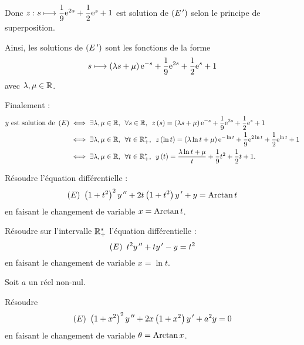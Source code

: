\begin{corr}
Donc \(z:s\longmapsto\dfrac{1}{9}\mathrm{e}^{2s}+\dfrac{1}{2}\mathrm{e}^{s}+1\) est solution de \(\left(E^{\,\prime}\right)\) selon le principe de superposition.

Ainsi, les solutions de \(\left(E^{\,\prime}\right)\) sont les fonctions de la forme \[s\longmapsto\left(\lambda s+\mu\right)\mathrm{e}^{-s}+\dfrac{1}{9}\mathrm{e}^{2s}+\dfrac{1}{2}\mathrm{e}^{s}+1\] avec \(\lambda,\mu\in\mathbb{R}\).

Finalement : \[\begin{aligned}
y\text{ est solution de }\paren{E}&\ssi\quantifs{\exists\lambda,\mu\in\R;\forall s\in\R}z\paren{s}=\paren{\lambda s+\mu}\e{-s}+\dfrac{1}{9}\e{2s}+\dfrac{1}{2}\e{s}+1 \\
&\ssi\quantifs{\exists\lambda,\mu\in\R;\forall t\in\Rps}z\paren{\ln t}=\paren{\lambda\ln t+\mu}\e{-\ln t}+\dfrac{1}{9}\e{2\ln t}+\dfrac{1}{2}\e{\ln t}+1 \\
&\ssi\quantifs{\exists\lambda,\mu\in\R;\forall t\in\Rps}y\paren{t}=\dfrac{\lambda\ln t+\mu}{t}+\dfrac{1}{9}t^2+\dfrac{1}{2}t+1.
\end{aligned}\]
\end{corr}

\begin{exo}[Exercice 11]
Résoudre l'équation différentielle : \[\left(E\right)~\left(1+t^2\right)^2y^{\,\prime\prime}+2t\left(1+t^2\right)y^{\,\prime}+y=\operatorname{Arctan} t\] en faisant le changement de variable \(x=\operatorname{Arctan} t\).
\end{exo}

\begin{corr}
\end{corr}

\begin{exo}[Exercice 12]
Résoudre sur l'intervalle \(\mathbb{R}_+^*\) l'équation différentielle : \[\left(E\right)~t^2y^{\,\prime\prime}+ty^{\,\prime}-y=t^2\] en faisant le changement de variable \(x=\ln t\).
\end{exo}

\begin{corr}
\end{corr}

\begin{exo}
Soit \(a\) un réel non-nul.

Résoudre \[\left(E\right)~\left(1+x^2\right)^2y^{\,\prime\prime}+2x\left(1+x^2\right)y^{\,\prime}+a^2y=0\] en faisant le changement de variable \(\theta=\operatorname{Arctan} x\).
\end{exo}

\begin{corr}
\end{corr}

